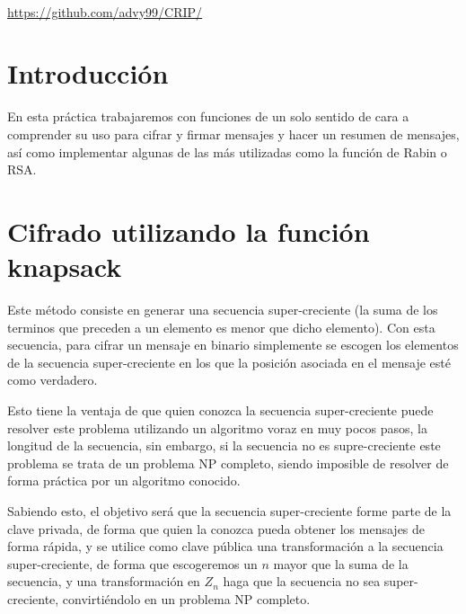 \documentclass[12pt, spanish]{article}
\makeatletter
\let\thedate\@date
\makeatother
\begin{document}
\begin{titlepage}
    {\large \thedate}\\[0.5cm]
    {\url{https://github.com/advy99/CRIP/}}
    {\doclicenseThis}

    \vfill

\end{titlepage}


\tableofcontents
\pagebreak



\section*{Introducción}

En esta práctica trabajaremos con funciones de un solo sentido de cara a comprender su uso para cifrar y firmar mensajes y hacer un resumen de mensajes, así como implementar algunas de las más utilizadas como la función de Rabin o RSA.


\section{Cifrado utilizando la función knapsack}

Este método consiste en generar una secuencia super-creciente (la suma de los terminos que preceden a un elemento es menor que dicho elemento). Con esta secuencia, para cifrar un mensaje en binario simplemente se escogen los elementos de la secuencia super-creciente en los que la posición asociada en el mensaje esté como verdadero.

Esto tiene la ventaja de que quien conozca la secuencia super-creciente puede resolver este problema utilizando un algoritmo voraz en muy pocos pasos, la longitud de la secuencia, sin embargo, si la secuencia no es supre-creciente este problema se trata de un problema NP completo, siendo imposible de resolver de forma práctica por un algoritmo conocido.

Sabiendo esto, el objetivo será que la secuencia super-creciente forme parte de la clave privada, de forma que quien la conozca pueda obtener los mensajes de forma rápida, y se utilice como clave pública una transformación a la secuencia super-creciente, de forma que escogeremos un $n$ mayor que la suma de la secuencia, y una transformación en $Z_n$ haga que la secuencia no sea super-creciente, convirtiéndolo en un problema NP completo.
\end{document}
